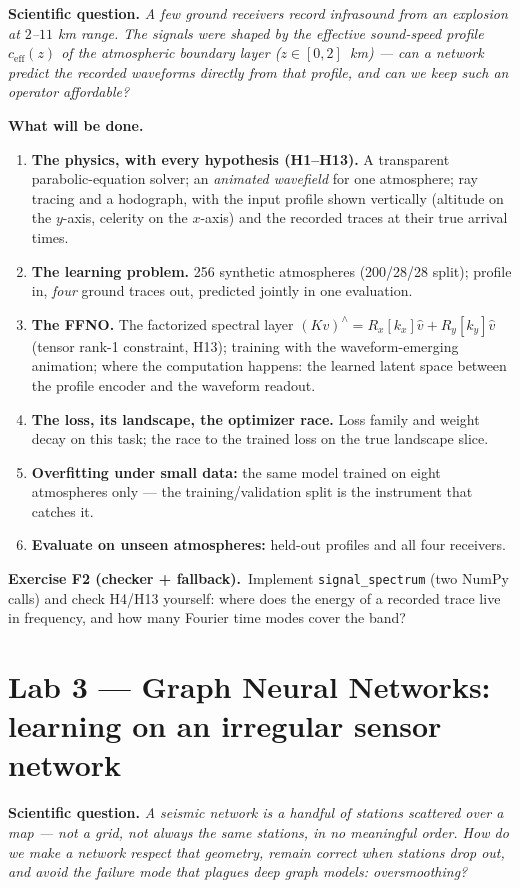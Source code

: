 \documentclass[11pt,a4paper]{article}
\newcommand{\labq}[1]{\medskip\noindent\textbf{\textcolor{black!55}{Scientific question.}} \textit{#1}\par}
\newcommand{\exo}[2]{\medskip\noindent\textbf{Exercise #1 (#2).}\ }
\begin{document}
\labq{A few ground receivers record infrasound from an explosion at $2$--$11$ km range. The
signals were shaped by the effective sound-speed profile $c_{\mathrm{eff}}(z)$ of the atmospheric
boundary layer ($z\in[0,2]$~km) --- can a network predict the recorded waveforms directly from
that profile, and can we keep such an operator affordable?}

\textbf{What will be done.}
\begin{enumerate}[leftmargin=*,itemsep=1pt]
\item \textbf{The physics, with every hypothesis (H1--H13).} A transparent parabolic-equation
solver; an \emph{animated wavefield} for one atmosphere; ray tracing and a hodograph, with the
input profile shown vertically (altitude on the $y$-axis, celerity on the $x$-axis) and the
recorded traces at their true arrival times.
\item \textbf{The learning problem.} 256 synthetic atmospheres (200/28/28 split);
profile in, \emph{four} ground traces out, predicted jointly in one evaluation.
\item \textbf{The FFNO.} The factorized spectral layer
$(Kv)^{\wedge}=R_x[k_x]\hat v+R_y[k_y]\hat v$ (tensor rank-1 constraint, H13); training with the
waveform-emerging animation; where the computation happens: the learned latent space between
the profile encoder and the waveform readout.
\item \textbf{The loss, its landscape, the optimizer race.} Loss family and weight decay on this
task; the race to the trained loss on the true landscape slice.
\item \textbf{Overfitting under small data:} the same model trained on eight atmospheres
only --- the training/validation split is the instrument that catches it.
\item \textbf{Evaluate on unseen atmospheres:} held-out profiles and all four receivers.
\end{enumerate}

\exo{F2}{checker + fallback}Implement \texttt{signal\_spectrum} (two NumPy calls) and
check H4/H13 yourself: where does the energy of a recorded trace live in frequency, and how many
Fourier time modes cover the band?

\section{Lab 3 --- Graph Neural Networks: learning on an irregular sensor network}

\labq{A seismic network is a handful of stations scattered over a map --- not a grid, not always
the same stations, in no meaningful order. How do we make a network respect that geometry,
remain correct when stations drop out, and avoid the failure mode that plagues deep graph
models: oversmoothing?}
\end{document}
